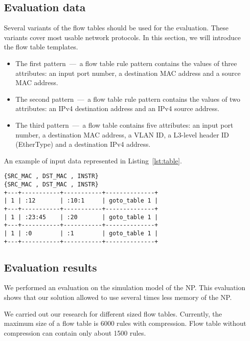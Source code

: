 \documentclass[conference]{IEEEtran}
\begin{document}
        \subsection{Evaluation data}
            Several variants of the flow tables should be used for the evaluation. 
            These variants cover most usable network protocols.
            In this section, we will introduce the flow table templates.
            \begin{itemize}
                \item The first pattern~---~a flow table rule pattern contains the values of three attributes: 
                    an input port number, a destination MAC address and a source MAC address.
                \item The second pattern~---~a flow table rule pattern contains the values of two attributes: 
                    an IPv4 destination address and an IPv4 source address.
                \item The third pattern~---~a flow table contains five attributes: 
                    an input port number, a destination MAC address, a VLAN ID, a L3-level header ID (EtherType) and a destination IPv4 address.
            \end{itemize}
            An example of input data represented in Listing~\ref{lst:table}.
\begin{lstlisting}[float=htb,caption=Example of input data for input of a flow table,label=lst:table]
{SRC_MAC , DST_MAC , INSTR}
{SRC_MAC , DST_MAC , INSTR}
+---+-----------+-----------+--------------+
| 1 | :12       | :10:1     | goto_table 1 |
+---+-----------+-----------+--------------+
| 1 | :23:45    | :20       | goto_table 1 |
+---+-----------+-----------+--------------+
| 1 | :0        | :1        | goto_table 1 |
+---+-----------+-----------+--------------+
\end{lstlisting}
        \subsection{Evaluation results}
            We performed an evaluation on the simulation model of the NP. 
            This evaluation shows that our solution allowed to use several times less memory of the NP.
            
            We carried out our research for different sized flow tables. 
            Currently, the maximum size of a flow table is 6000 rules with compression. 
            Flow table without compression can contain only about 1500 rules.
\end{document}
